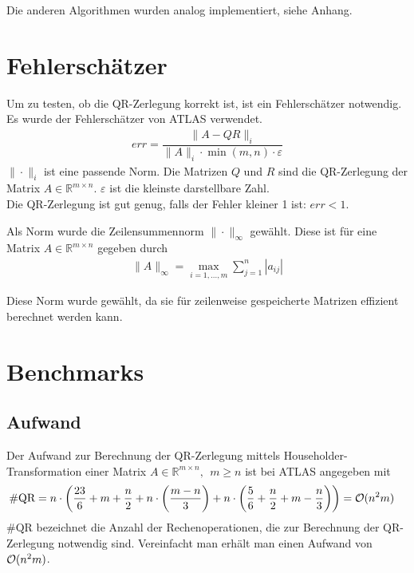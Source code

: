 Die anderen Algorithmen wurden analog implementiert, siehe Anhang.

\section{Fehlerschätzer} \label{Fehlerschätzer}

Um zu testen, ob die QR-Zerlegung korrekt ist, ist ein Fehlerschätzer notwendig.
Es wurde der Fehlerschätzer von ATLAS \cite{atlas} verwendet.
\begin{align}
err = \dfrac{\|A - QR\|_i}{\|A\|_i \cdot \min(m,n) \cdot \varepsilon}
\end{align}
$\|\cdot\|_i$ ist eine passende Norm.
Die Matrizen $Q$ und $R$ sind die QR-Zerlegung der Matrix $A \in \mathbb{R}^{m \times n}$.
$\varepsilon$ ist die kleinste darstellbare Zahl.\\
Die QR-Zerlegung ist gut genug, falls der Fehler kleiner 1 ist: $ err < 1 $.

Als Norm wurde die Zeilensummennorm $\|\cdot\|_\infty$ gewählt.
Diese ist für eine Matrix $A \in \mathbb{R}^{m\times n}$ gegeben durch
\begin{align*}
\|A\|_\infty = \max_{i=1,...,m} \sum_{j=1}^{n} |a_{ij}|
\end{align*}

Diese Norm wurde gewählt, da sie für zeilenweise gespeicherte Matrizen effizient berechnet werden kann.

\section{Benchmarks}

\subsection{Aufwand}

Der Aufwand zur Berechnung der QR-Zerlegung mittels Householder-Transformation einer Matrix $A \in \mathbb{R}^{m \times n},~~ m \ge n$ ist bei ATLAS \cite{atlas} angegeben mit
\begin{align*}
\#\text{QR} &= n \cdot \left(\frac{23}{6} + m + \dfrac{n}{2} + n\cdot \left(\frac{m-n}{3} \right) + n\cdot \left(\dfrac{5}{6} + \dfrac{n}{2} + m - \dfrac{n}{3}\right)\right) = {\cal O}(n^2m)
\end{align*}
$\#\text{QR}$ bezeichnet die Anzahl der Rechenoperationen, die zur Berechnung der QR-Zerlegung notwendig sind. 
Vereinfacht man erhält man einen Aufwand von $ {\cal O}(n^2m)$.

